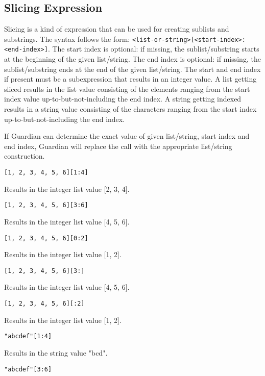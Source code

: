 
\subsection{Slicing Expression}
{
	Slicing is a kind of expression that can be used for creating sublists
	and substrings. The syntax follows the
	form: \texttt{<list-or-string>[<start-index>:<end-index>]}.
	The start index is optional: if missing, the sublist/substring starts at
	the beginning of the given list/string.
	The end index is optional: if missing, the sublist/substring ends at
	the end of the given list/string.
	The start and end index if present must be a subexpression that results
	in an integer value.
	A list getting sliced results in the list value consisting of the elements
	ranging from the start index value up-to-but-not-including the end index.
	A string getting indexed results in a string value consisting of the
	characters ranging from the start index up-to-but-not-including the end
	index.
	
	If Guardian can determine the exact value of given list/string,
	start index and end index, Guardian
	will replace the call with the appropriate list/string construction.
	
	\begin{itemize}
	{
		\item[] \texttt{[1, 2, 3, 4, 5, 6][1:4]}
		
			Results in the integer list value [2, 3, 4].
		
		\item[] \texttt{[1, 2, 3, 4, 5, 6][3:6]}
		
			Results in the integer list value [4, 5, 6].
		
		\item[] \texttt{[1, 2, 3, 4, 5, 6][0:2]}
		
			Results in the integer list value [1, 2].
		
		\item[] \texttt{[1, 2, 3, 4, 5, 6][3:]}
		
			Results in the integer list value [4, 5, 6].
		
		\item[] \texttt{[1, 2, 3, 4, 5, 6][:2]}
		
			Results in the integer list value [1, 2].
		
		\item[] \texttt{"abcdef"[1:4]}
		
			Results in the string value "bcd".
		
		\item[] \texttt{"abcdef"[3:6]}
		
}
\end{itemize}}
